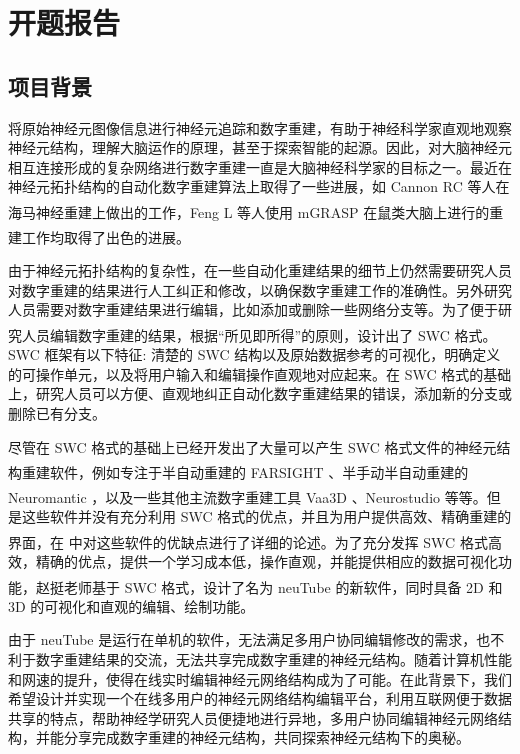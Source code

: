 \newcommand{\upcite}[1]{\textsuperscript{\textsuperscript{\cite{#1}}}}
\chapter*{\zjutitlec 开题报告}

\section{项目背景}
将原始神经元图像信息进行神经元追踪和数字重建，有助于神经科学家直观地观察神经元结构，理解大脑运作的原理，甚至于探索智能的起源。因此，对大脑神经元相互连接形成的复杂网络进行数字重建一直是大脑神经科学家的目标之一。最近在神经元拓扑结构的自动化数字重建算法上取得了一些进展，如 Cannon RC 等人在海马神经重建上做出的工作\upcite{Cannon1998An}，Feng L 等人使用 mGRASP 在鼠类大脑上进行的重建工作\upcite{Druckmann2014Structured}均取得了出色的进展。

由于神经元拓扑结构的复杂性，在一些自动化重建结果的细节上仍然需要研究人员对数字重建的结果进行人工纠正和修改，以确保数字重建工作的准确性。另外研究人员需要对数字重建结果进行编辑，比如添加或删除一些网络分支等。为了便于研究人员编辑数字重建的结果，根据“所见即所得”的原则，设计出了 SWC 格式\upcite{Peng2011Proof}。SWC 框架有以下特征: 清楚的 SWC 结构以及原始数据参考的可视化，明确定义的可操作单元，以及将用户输入和编辑操作直观地对应起来。在 SWC 格式的基础上，研究人员可以方便、直观地纠正自动化数字重建结果的错误，添加新的分支或删除已有分支。

尽管在 SWC 格式的基础上已经开发出了大量可以产生 SWC 格式文件的神经元结构重建软件，例如专注于半自动重建的 FARSIGHT \upcite{Luisi2011The}、半手动半自动重建的 Neuromantic \upcite{Myatt2012Neuromantic}，以及一些其他主流数字重建工具 Vaa3D \upcite{Peng2010Seeing}、Neurostudio \upcite{Rodriguez2006Rayburst} 等等。但是这些软件并没有充分利用 SWC 格式的优点，并且为用户提供高效、精确重建的界面，在 \upcite{Feng2014neuTube} 中对这些软件的优缺点进行了详细的论述。为了充分发挥 SWC 格式高效，精确的优点，提供一个学习成本低，操作直观，并能提供相应的数据可视化功能，赵挺老师基于 SWC 格式，设计了名为 neuTube 的新软件\upcite{Feng2014neuTube}，同时具备 2D 和 3D 的可视化和直观的编辑、绘制功能。

由于 neuTube 是运行在单机的软件，无法满足多用户协同编辑修改的需求，也不利于数字重建结果的交流，无法共享完成数字重建的神经元结构。随着计算机性能和网速的提升，使得在线实时编辑神经元网络结构成为了可能。在此背景下，我们希望设计并实现一个在线多用户的神经元网络结构编辑平台，利用互联网便于数据共享的特点，帮助神经学研究人员便捷地进行异地，多用户协同编辑神经元网络结构，并能分享完成数字重建的神经元结构，共同探索神经元结构下的奥秘。

